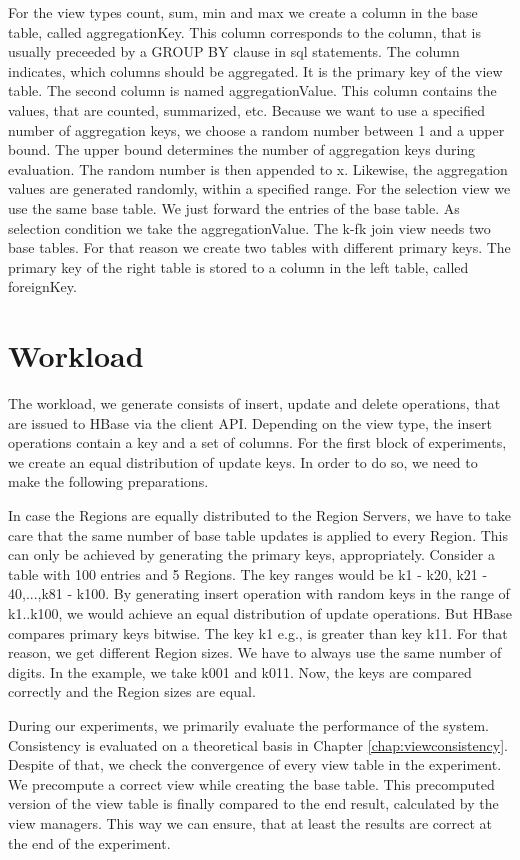 \documentclass[11pt,a4paper,bibtotoc,idxtotoc,headsepline,footsepline,footexclude,BCOR12mm,DIV13]{scrbook}
\begin{document}
For the view types count, sum, min and max we create a column in the base table, called aggregationKey. This column corresponds to the column, that is usually preceeded by a GROUP BY clause in sql statements. The column indicates, which columns should be aggregated. It is the primary key of the view table. The second column is named aggregationValue. This column contains the values, that are counted, summarized, etc. Because we want to use a specified number of aggregation keys, we choose a random number between 1 and a upper bound. The upper bound determines the number of aggregation keys during evaluation. The random number is then appended to x. Likewise, the aggregation values are generated randomly, within a specified range. For the selection view we use the same base table. We just forward the entries of the base table. As selection condition we take the aggregationValue. The k-fk join view needs two base tables. For that reason we create two tables with different primary keys. The primary key of the right table is stored to a column in the left table, called foreignKey.

\section{Workload}

The workload, we generate consists of insert, update and delete operations, that are issued to HBase via the client API. Depending on the view type, the insert operations contain a key and a set of columns. For the first block of experiments, we create an equal distribution of update keys. In order to do so, we need to make the following preparations. 


In case the Regions are equally distributed to the Region Servers, we have to take care that the same number of base table updates is applied to every Region. This can only be achieved by generating the primary keys, appropriately. Consider a table with 100 entries and 5 Regions. The key ranges would be k1 - k20, k21 - 40,...,k81 - k100. By generating insert operation with random keys in the range of k1..k100, we would achieve an equal distribution of update operations. But HBase compares primary keys bitwise. The key k1 e.g., is greater than key k11. For that reason, we get different Region sizes. We have to always use the same number of digits. In the example, we take k001 and k011. Now, the keys are compared correctly and the Region sizes are equal.

During our experiments, we primarily evaluate the performance of the system. Consistency is evaluated on a theoretical basis in Chapter \ref{chap:viewconsistency}. Despite of that, we check the convergence of every view table in the experiment. We precompute a correct view while creating the base table. This precomputed version of the view table is finally compared to the end result, calculated by the view managers. This way we can ensure, that at least the results are correct at the end of the experiment.
\end{document}
